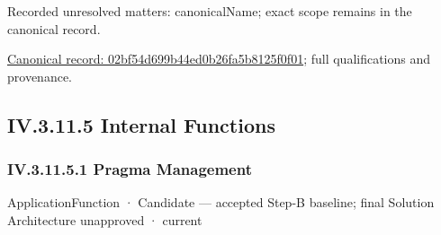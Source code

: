 {\small Recorded unresolved matters: canonicalName; exact scope remains in the canonical record.}\par
{\footnotesize \href{../../../../continuum/application/application-service/02bf54d699b44ed0b26fa5b8125f0f01.md}{Canonical record: 02bf54d699b44ed0b26fa5b8125f0f01}; full qualifications and provenance.}\par
\subsection*{IV.3.11.5 Internal Functions}
\label{navigation:IV.3.11.5}

\subsubsection*{IV.3.11.5.1 Pragma Management}
\label{navigation:IV.3.11.5.1}

\label{element:ab0cdaa7ed4149ee856216efa5a265c4}
{\small ApplicationFunction · Candidate — accepted Step-B baseline; final Solution Architecture unapproved · current}\par

